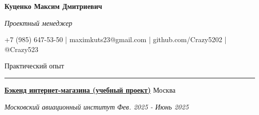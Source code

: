 \documentclass[14pt, a4paper, oneside]{extarticle}
\begin{document}



\begin{center}
    \textbf{\LARGE Куценко Максим Дмитриевич}
    
    \textit{\Large Проектный менеджер}
\end{center}

\begin{center}
	\vspace{-0.5\intextsep}
	\small
    \faPhone* \space +7 (985) 647-53-50 | \faEnvelope \space maximkuts23@gmail.com | \faGithub \space github.com/Crazy5202 | \faTelegram \space @Crazy523
\end{center}


\begin{flushleft}
	\vspace{-\intextsep}
	\large Практический опыт
\end{flushleft}

\vspace{-0.8\intextsep}
\hrule


\begin{flushleft}
	\vspace{-0.8\intextsep}
	\quad
	\href{https://github.com/Crazy5202/eComm}{\textbf{Бэкенд интернет-магазина (учебный проект)}}
	\hfill
	Москва
\end{flushleft}

\begin{flushleft}
	\vspace{-1\intextsep}
	\quad
	\textit{Московский авиационный институт}
	\hfill
	\textit{\small Фев. 2025 - Июнь 2025}
\end{flushleft}

\end{document}
